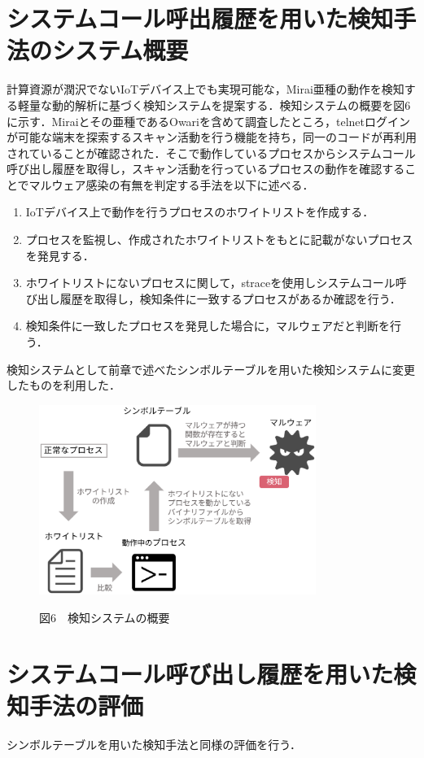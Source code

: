 \section{システムコール呼出履歴を用いた検知手法のシステム概要}
計算資源が潤沢でないIoTデバイス上でも実現可能な，Mirai亜種の動作を検知する軽量な動的解析に基づく検知システムを提案する．検知システムの概要を図6に示す．Miraiとその亜種であるOwariを含めて調査したところ，telnetログインが可能な端末を探索するスキャン活動を行う機能を持ち，同一のコードが再利用されていることが確認された．そこで動作しているプロセスからシステムコール呼び出し履歴を取得し，スキャン活動を行っているプロセスの動作を確認することでマルウェア感染の有無を判定する手法を以下に述べる．

\begin{enumerate}
 \item IoTデバイス上で動作を行うプロセスのホワイトリストを作成する．
 \item プロセスを監視し、作成されたホワイトリストをもとに記載がないプロセスを発見する．
 \item ホワイトリストにないプロセスに関して，straceを使用しシステムコール呼び出し履歴を取得し，検知条件に一致するプロセスがあるか確認を行う．
 \item 検知条件に一致したプロセスを発見した場合に，マルウェアだと判断を行う．
 \end{enumerate}
 
 検知システムとして前章で述べたシンボルテーブルを用いた検知システムに変更したものを利用した．
 
 \begin{figure}[h]
 \centering
    \includegraphics[width=90mm]{figures/system.eps}
 \label{fig:model}
 \begin{center}図6　検知システムの概要\end{center}
 \end{figure}
 
\section{システムコール呼び出し履歴を用いた検知手法の評価}
シンボルテーブルを用いた検知手法と同様の評価を行う．




